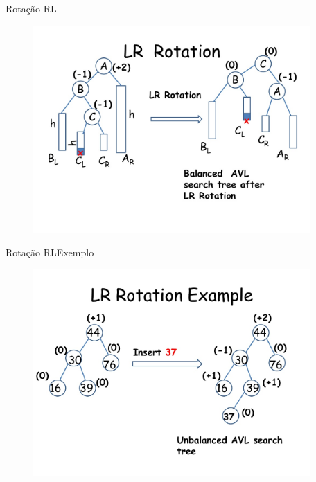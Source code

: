 \documentclass[aspectratio=169]{beamer}
\begin{document}
\begin{frame}{Rotação RL}
\begin{figure}[!h]
  \centering
  \includegraphics[width=300pt]{imagens/lr_rotation1.png}
  \label{fig_lr_rotation1}
\end{figure}
\end{frame}


\begin{frame}{Rotação RL}{Exemplo}
\begin{figure}[!h]
  \centering
  \includegraphics[width=300pt]{imagens/lr_rotation_example.png}
  \label{fig_lr_rotation_example}
\end{figure}
\end{frame}

\end{document}
